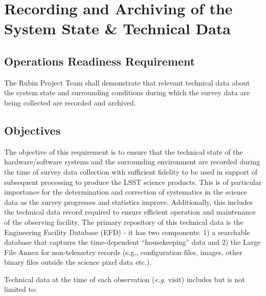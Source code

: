 \section{Recording and Archiving of the System State \& Technical Data}  \label{sec:metadata}

\subsection{Operations Readiness Requirement}

The Rubin Project Team shall demonstrate that relevant technical data about the system state and surrounding conditions during which the survey data are being collected are recorded and archived.

\subsection{Objectives}

The objective of this requirement is to ensure that the technical state of the hardware/software systems and the surrounding environment are recorded during the time of survey data collection with sufficient fidelity to be used in support of subsequent processing to produce the LSST science products. This is of particular importance for the determination and correction of systematics in the science data as the survey progresses and statistics improve.  Additionally, this includes the technical data record required to ensure efficient operation and maintenance of the observing facility.   The primary repository of this technical data is the Engineering Facility Database (EFD) - it has two components:
1) a searchable database that captures the time-dependent ``housekeeping'' data and
2) the Large File Annex for non-telemetry records (e.g., configuration files, images, other binary files outside the science pixel data etc.).

Technical data at the time of each observation ({\it e.g.} visit) includes but is not limited to:

